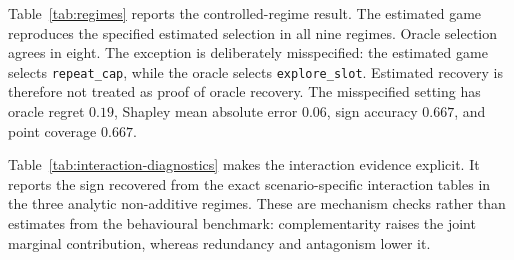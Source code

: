 \documentclass[review]{elsarticle}
\theoremstyle{plain}
\theoremstyle{definition}
\theoremstyle{remark}
\begin{document}
Table~\ref{tab:regimes} reports the controlled-regime result. The estimated game reproduces the specified estimated selection in all nine regimes. Oracle selection agrees in eight. The exception is deliberately misspecified: the estimated game selects \texttt{repeat\_cap}, while the oracle selects \texttt{explore\_slot}. Estimated recovery is therefore not treated as proof of oracle recovery. The misspecified setting has oracle regret $0.19$, Shapley mean absolute error $0.06$, sign accuracy $0.667$, and point coverage $0.667$.

\begin{table}[t]
\caption{Controlled oracle-regime validation. ``Estimated match'' compares the selected estimated-game portfolio with the declared estimated target; ``oracle match'' compares it with the true-game portfolio.}\label{tab:regimes}
\centering
\scriptsize
\setlength{\tabcolsep}{3pt}
\end{table}

Table~\ref{tab:interaction-diagnostics} makes the interaction evidence explicit. It reports the sign recovered from the exact scenario-specific interaction tables in the three analytic non-additive regimes. These are mechanism checks rather than estimates from the behavioural benchmark: complementarity raises the joint marginal contribution, whereas redundancy and antagonism lower it.
\end{document}
